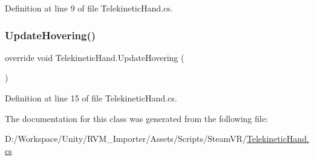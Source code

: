 Definition at line 9 of file Telekinetic\+Hand.\+cs.

\mbox{\label{class_telekinetic_hand_a625aaa03a03c5ece9ffdf4afe2e30ab7}} 
\subsubsection{\texorpdfstring{UpdateHovering()}{UpdateHovering()}}
{\footnotesize\ttfamily override void Telekinetic\+Hand.\+Update\+Hovering (\begin{DoxyParamCaption}{ }\end{DoxyParamCaption})\hspace{0.3cm}{\ttfamily [protected]}}



Definition at line 15 of file Telekinetic\+Hand.\+cs.



The documentation for this class was generated from the following file\+:\begin{DoxyCompactItemize}
\item 
D\+:/\+Workspace/\+Unity/\+R\+V\+M\+\_\+\+Importer/\+Assets/\+Scripts/\+Steam\+V\+R/\mbox{\hyperlink{_telekinetic_hand_8cs}{Telekinetic\+Hand.\+cs}}\end{DoxyCompactItemize}
